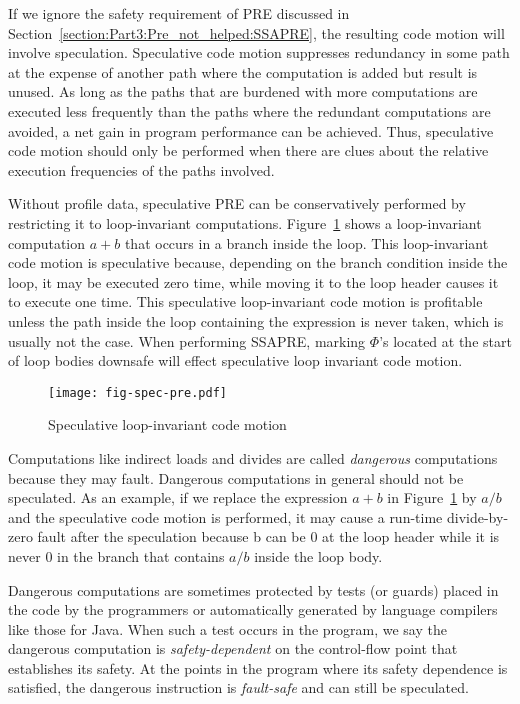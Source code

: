 If we ignore the safety requirement of PRE discussed in 
Section~\ref{section:Part3:Pre_not_helped:SSAPRE}, the resulting code motion
will involve speculation.  Speculative code motion suppresses
redundancy in some path at the expense of another path where the computation 
is added but result is unused.  As long as the paths that are burdened with
more computations are executed less frequently than the paths where the
redundant computations are avoided, a net gain in program performance can be
achieved.  Thus, speculative code motion should only be performed when there
are clues about the relative execution frequencies of the paths involved.

Without profile data, speculative PRE can be conservatively performed by
restricting it to loop-invariant computations.  
Figure~\ref{fig:spec-pre} shows
a loop-invariant computation $a+b$ that occurs in a branch inside the loop.
This loop-invariant code motion is speculative because, depending on the
branch condition inside the loop, it may be executed zero time, while moving it
to the loop header causes it to execute one time. This speculative 
loop-invariant code motion is profitable unless the path inside the loop
containing the expression is never taken, which is usually not the case.
When performing SSAPRE, marking $\Phi$'s located at the start of loop bodies
downsafe will effect speculative loop invariant code motion. 

\begin{figure}
\centering
\texttt{[image: fig-spec-pre.pdf]}
\caption{Speculative loop-invariant code motion}
\label{fig:spec-pre}
\end{figure}

Computations like indirect loads and divides are called \emph{dangerous}
computations because they may fault.  Dangerous computations in general should
not be speculated.
As an example, if we replace the expression $a+b$ in Figure~\ref{fig:spec-pre}
by $a/b$ and the speculative code motion is performed, it may cause a run-time
divide-by-zero fault after the speculation because b can be $0$ at the 
loop header while it is never $0$ in the branch that contains $a/b$ inside the 
loop body.

Dangerous computations are sometimes protected by tests (or guards) placed in
the code by the programmers or automatically generated by language compilers
like those for Java.  When such a test occurs in the
program, we say the dangerous computation is \emph{safety-dependent} on
the control-flow point that establishes its safety.  At the points in the 
program where its safety dependence is satisfied, the dangerous instruction
is \emph{fault-safe} and can still be speculated.

